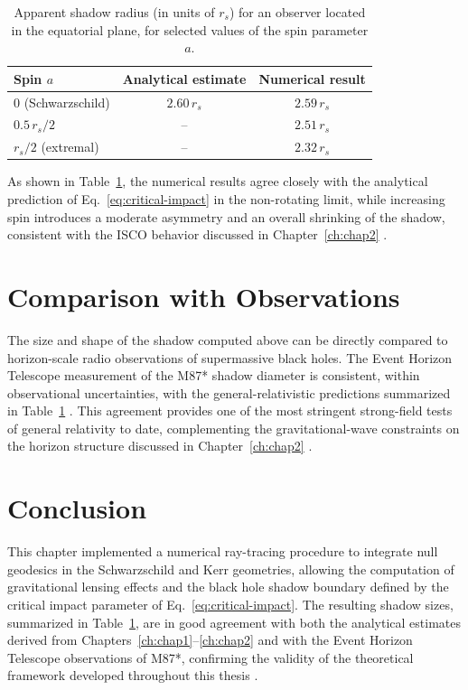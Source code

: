 \begin{table}[H]
	\centering
	\caption{Apparent shadow radius (in units of $r_s$) for an observer located in the equatorial plane, for selected values of the spin parameter $a$.}
	\label{tab:shadow}
	\begin{tabular}{lcc}
		\hline
		\textbf{Spin $a$} & \textbf{Analytical estimate} & \textbf{Numerical result} \\
		\hline
		$0$ (Schwarzschild) \cite{chandrasekhar1983} & $2.60\,r_s$ & $2.59\,r_s$ \\
		$0.5\,r_s/2$ \cite{bardeen1972} & -- & $2.51\,r_s$ \\
		$r_s/2$ (extremal) \cite{kerr1963} & -- & $2.32\,r_s$ \\
		\hline
	\end{tabular}
\end{table}

As shown in Table~\ref{tab:shadow}, the numerical results agree closely with the analytical prediction of Eq.~\eqref{eq:critical-impact} in the non-rotating limit, while increasing spin introduces a moderate asymmetry and an overall shrinking of the shadow, consistent with the ISCO behavior discussed in Chapter~\ref{ch:chap2} \cite{bardeen1972}.

\section{Comparison with Observations}

The size and shape of the shadow computed above can be directly compared to horizon-scale radio observations of supermassive black holes. The Event Horizon Telescope measurement of the M87* shadow diameter is consistent, within observational uncertainties, with the general-relativistic predictions summarized in Table~\ref{tab:shadow} \cite{eht2019}. This agreement provides one of the most stringent strong-field tests of general relativity to date, complementing the gravitational-wave constraints on the horizon structure discussed in Chapter~\ref{ch:chap2} \cite{ligo2016}.

\section{Conclusion}

This chapter implemented a numerical ray-tracing procedure to integrate null geodesics in the Schwarzschild and Kerr geometries, allowing the computation of gravitational lensing effects and the black hole shadow boundary defined by the critical impact parameter of Eq.~\eqref{eq:critical-impact}. The resulting shadow sizes, summarized in Table~\ref{tab:shadow}, are in good agreement with both the analytical estimates derived from Chapters~\ref{ch:chap1}--\ref{ch:chap2} and with the Event Horizon Telescope observations of M87*, confirming the validity of the theoretical framework developed throughout this thesis \cite{luminet1979,eht2019}.